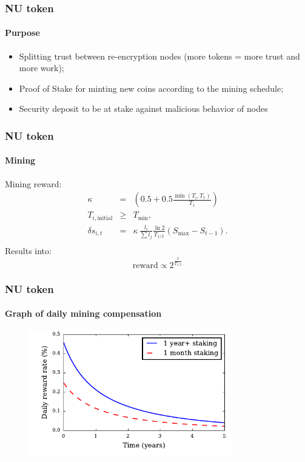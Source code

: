 \documentclass[xetex,mathsans,sans,aspectratio=169]{beamer}
\begin{document}
    \begin{frame}
        \frametitle{NU token}
        \framesubtitle{Purpose}
        \begin{itemize}
            \item Splitting trust between re-encryption nodes (more tokens = more trust and more work);
            \item Proof of Stake for minting new coins according to the mining schedule;
            \item Security deposit to be at stake against malicious behavior of nodes
        \end{itemize}
    \end{frame}

    \begin{frame}
        \frametitle{NU token}
        \framesubtitle{Mining}
        Mining reward:
        \begin{eqnarray}
            \kappa &=& \left(0.5 + 0.5\frac{\min(T_i, T_1)}{T_1}\right)\\
            T_{i,\text{initial}} &\ge& T_{\min},\\
            \delta s_{i,t} &=&  \kappa\, \frac{l_i}{\sum l_j} \frac{\ln{2}}{T_{1/2}} \left( S_{\max} - S_{t-1}\right).\\
        \end{eqnarray}
        Results into:
        $$\text{reward} \propto 2^{\frac{t}{T_{1/2}}}$$
    \end{frame}

    \begin{frame}
        \frametitle{NU token}
        \framesubtitle{Graph of daily mining compensation}
        \begin{figure}
            \centering
            \includegraphics[height=5.5cm]{pdf/daily-compensation.pdf}
        \end{figure}
    \end{frame}
\end{document}
